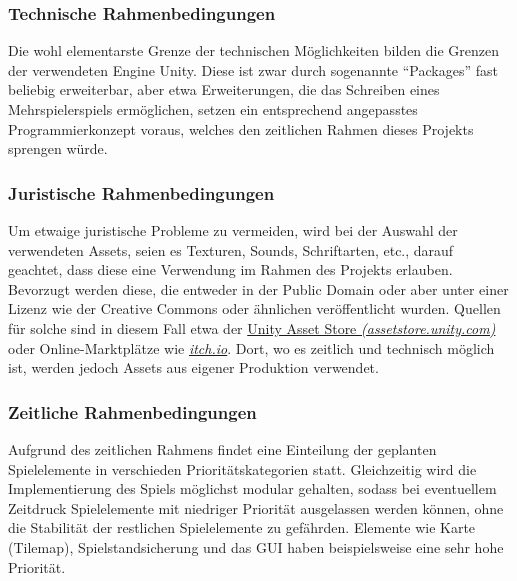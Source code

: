 \documentclass[paper=A4,pagesize=auto,12pt,headinclude=true,footinclude=true,BCOR=0mm,DIV=calc]{scrartcl}
\begin{document}
\subsubsection{Technische Rahmenbedingungen}
Die wohl elementarste Grenze der technischen Möglichkeiten bilden die Grenzen der verwendeten Engine Unity. Diese ist zwar durch sogenannte "`Packages"' fast beliebig erweiterbar, aber etwa Erweiterungen, die das Schreiben eines Mehrspielerspiels ermöglichen, setzen ein entsprechend angepasstes Programmierkonzept voraus, welches den zeitlichen Rahmen dieses Projekts sprengen würde.

\subsubsection{Juristische Rahmenbedingungen}
Um etwaige juristische Probleme zu vermeiden, wird bei der Auswahl der verwendeten Assets, seien es Texturen, Sounds, Schriftarten, etc., darauf geachtet, dass diese eine Verwendung im Rahmen des Projekts erlauben. Bevorzugt werden diese, die entweder in der Public Domain oder aber unter einer Lizenz wie der Creative Commons \cite{cc_licenses} oder ähnlichen veröffentlicht wurden. Quellen für solche sind in diesem Fall etwa der \hyperref{https://assetstore.unity.com/}{}{}{Unity Asset Store \textit{(assetstore.unity.com)}} oder Online-Marktplätze wie \hyperref{https://itch.io/}{}{}{\textit{itch.io}}. Dort, wo es zeitlich und technisch möglich ist, werden jedoch Assets aus eigener Produktion verwendet.

\subsubsection{Zeitliche Rahmenbedingungen}
Aufgrund des zeitlichen Rahmens findet eine Einteilung der geplanten Spielelemente in verschieden Prioritätskategorien statt. Gleichzeitig wird die Implementierung des Spiels möglichst modular gehalten, sodass bei eventuellem Zeitdruck Spielelemente mit niedriger Priorität ausgelassen werden können, ohne die Stabilität der restlichen Spielelemente zu gefährden. Elemente wie Karte (Tilemap), Spielstandsicherung und das GUI haben beispielsweise eine sehr hohe Priorität.

\newpage
\end{document}

